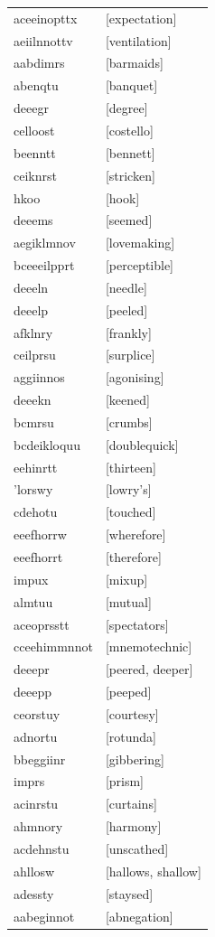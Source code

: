 \documentclass{article}
\begin{document}
\begin{tabular}{ll}
aceeinopttx & [expectation] \\
aeiilnnottv & [ventilation] \\
aabdimrs & [barmaids] \\
abenqtu & [banquet] \\
deeegr & [degree] \\
celloost & [costello] \\
beenntt & [bennett] \\
ceiknrst & [stricken] \\
hkoo & [hook] \\
deeems & [seemed] \\
aegiklmnov & [lovemaking] \\
bceeeilpprt & [perceptible] \\
deeeln & [needle] \\
deeelp & [peeled] \\
afklnry & [frankly] \\
ceilprsu & [surplice] \\
aggiinnos & [agonising] \\
deeekn & [keened] \\
bcmrsu & [crumbs] \\
bcdeikloquu & [doublequick] \\
eehinrtt & [thirteen] \\
'lorswy & [lowry's] \\
cdehotu & [touched] \\
eeefhorrw & [wherefore] \\
eeefhorrt & [therefore] \\
impux & [mixup] \\
almtuu & [mutual] \\
aceoprsstt & [spectators] \\
cceehimmnnot & [mnemotechnic] \\
deeepr & [peered, deeper] \\
deeepp & [peeped] \\
ceorstuy & [courtesy] \\
adnortu & [rotunda] \\
bbeggiinr & [gibbering] \\
imprs & [prism] \\
acinrstu & [curtains] \\
ahmnory & [harmony] \\
acdehnstu & [unscathed] \\
ahllosw & [hallows, shallow] \\
adessty & [staysed] \\
aabeginnot & [abnegation] \\

\end{tabular}
\end{document}
